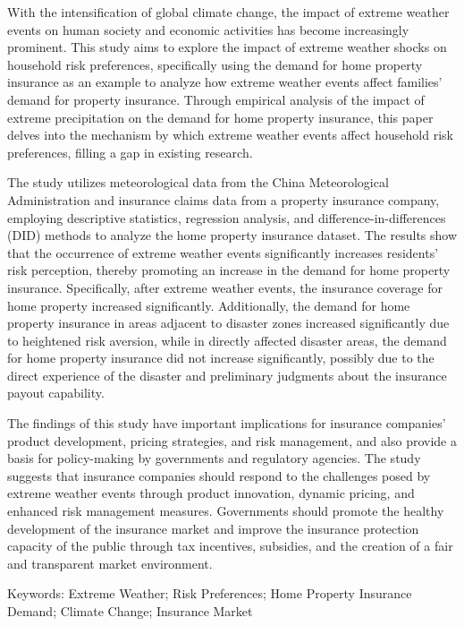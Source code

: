 \begin{eabstract}
With the intensification of global climate change, the impact of extreme weather events on human society and economic activities has become increasingly prominent. This study aims to explore the impact of extreme weather shocks on household risk preferences, specifically using the demand for home property insurance as an example to analyze how extreme weather events affect families' demand for property insurance. Through empirical analysis of the impact of extreme precipitation on the demand for home property insurance, this paper delves into the mechanism by which extreme weather events affect household risk preferences, filling a gap in existing research.

The study utilizes meteorological data from the China Meteorological Administration and insurance claims data from a property insurance company, employing descriptive statistics, regression analysis, and difference-in-differences (DID) methods to analyze the home property insurance dataset. The results show that the occurrence of extreme weather events significantly increases residents' risk perception, thereby promoting an increase in the demand for home property insurance. Specifically, after extreme weather events, the insurance coverage for home property increased significantly. Additionally, the demand for home property insurance in areas adjacent to disaster zones increased significantly due to heightened risk aversion, while in directly affected disaster areas, the demand for home property insurance did not increase significantly, possibly due to the direct experience of the disaster and preliminary judgments about the insurance payout capability.

The findings of this study have important implications for insurance companies' product development, pricing strategies, and risk management, and also provide a basis for policy-making by governments and regulatory agencies. The study suggests that insurance companies should respond to the challenges posed by extreme weather events through product innovation, dynamic pricing, and enhanced risk management measures. Governments should promote the healthy development of the insurance market and improve the insurance protection capacity of the public through tax incentives, subsidies, and the creation of a fair and transparent market environment.

Keywords: Extreme Weather; Risk Preferences; Home Property Insurance Demand; Climate Change; Insurance Market
\end{eabstract}
